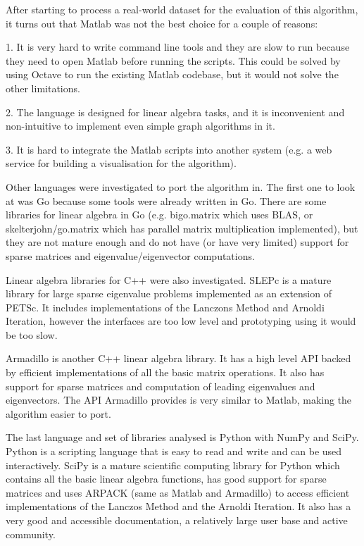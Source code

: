 \documentclass[12pt]{report}
\begin{document}
After starting to process a real-world dataset for the evaluation of this
algorithm, it turns out that Matlab was not the best choice for a couple of
reasons:

1. It is very hard to write command line tools and they are slow to run because
they need to open Matlab before running the scripts. This could be solved by
using Octave to run the existing Matlab codebase, but it would not solve the
other limitations.

2. The language is designed for linear algebra tasks, and it is inconvenient and
non-intuitive to implement even simple graph algorithms in it.

3. It is hard to integrate the Matlab scripts into another system (e.g. a
web service for building a visualisation for the algorithm).


Other languages were investigated to port the algorithm in. The first one to
look at was Go because some tools were already written in Go. There are some
libraries for linear algebra in Go (e.g. bigo.matrix which uses BLAS, or
skelterjohn/go.matrix which has parallel matrix multiplication implemented), but
they are not mature enough and do not have (or have very limited) support for
sparse matrices and eigenvalue/eigenvector computations.

Linear algebra libraries for C++ were also investigated. SLEPc is a mature
library for large sparse eigenvalue problems implemented as an extension of
PETSc. It includes implementations of the Lanczons Method and Arnoldi Iteration,
however the interfaces are too low level and prototyping using it would be too
slow.

Armadillo is another C++ linear algebra library. It has a high level API backed
by efficient implementations of all the basic matrix operations. It also has
support for sparse matrices and computation of leading eigenvalues and eigenvectors.
The API Armadillo provides is very similar to Matlab, making the algorithm easier
to port.

The last language and set of libraries analysed is Python with NumPy and SciPy.
Python is a scripting language that is easy to read and write and can be used
interactively. SciPy is a mature scientific computing library for Python which
contains all the basic linear algebra functions, has good support for sparse
matrices and uses ARPACK (same as Matlab and Armadillo) to access efficient
implementations of the Lanczos Method and the Arnoldi Iteration. It also has a
very good and accessible documentation, a relatively large user base and active
community.
\end{document}
